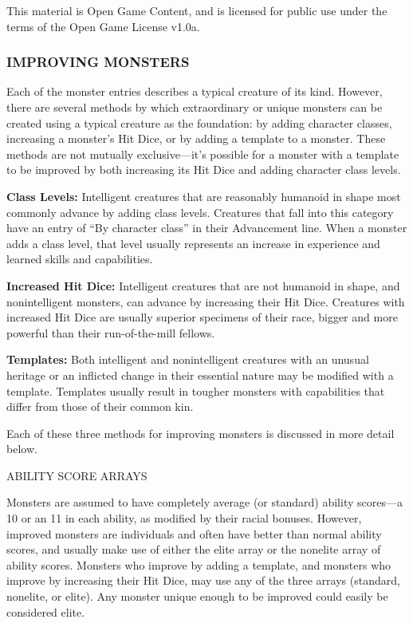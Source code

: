 \documentclass{article}
\begin{document}
This material is Open Game Content, and is licensed for public use under the terms 
of the Open Game License v1.0a.

\subsubsection*{{\LARGE{}IMPROVING MONSTERS}}

Each of the monster entries describes a typical creature of its kind. However, 
there are several methods by which extraordinary or unique monsters can be created 
using a typical creature as the foundation: by adding character classes, increasing 
a monster's Hit Dice, or by adding a template to a monster. These methods are not 
mutually exclusive---it's possible for a monster with a template to be improved 
by both increasing its Hit Dice and adding character class levels.

\textbf{Class Levels:} Intelligent creatures that are reasonably humanoid in shape 
most commonly advance by adding class levels. Creatures that fall into this category 
have an entry of ``By character class'' in their Advancement line. When a monster 
adds a class level, that level usually represents an increase in experience and 
learned skills and capabilities.

\textbf{Increased Hit Dice:} Intelligent creatures that are not humanoid in shape, 
and nonintelligent monsters, can advance by increasing their Hit Dice. Creatures 
with increased Hit Dice are usually superior specimens of their race, bigger and 
more powerful than their run-of-the-mill fellows.

\textbf{Templates:} Both intelligent and nonintelligent creatures with an unusual 
heritage or an inflicted change in their essential nature may be modified with 
a template. Templates usually result in tougher monsters with capabilities that 
differ from those of their common kin.

Each of these three methods for improving monsters is discussed in more detail 
below.

\vspace{12pt}
{\LARGE{}ABILITY SCORE ARRAYS}

Monsters are assumed to have completely average (or standard) ability scores---a 
10 or an 11 in each ability, as modified by their racial bonuses. However, improved 
monsters are individuals and often have better than normal ability scores, and 
usually make use of either the elite array or the nonelite array of ability scores. 
Monsters who improve by adding a template, and monsters who improve by increasing 
their Hit Dice, may use any of the three arrays (standard, nonelite, or elite). 
Any monster unique enough to be improved could easily be considered elite.
\end{document}
